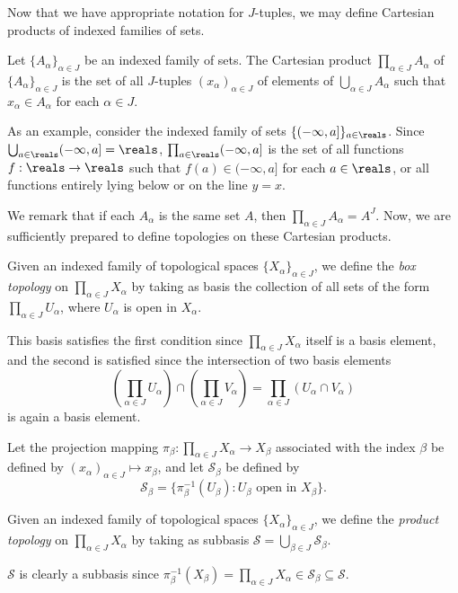 Now that we have appropriate notation for $J$-tuples, we may define Cartesian products of indexed families of sets.
\begin{definition}\label{2.44}
    Let $\{A_\alpha\}_{\alpha \in J}$ be an indexed family of sets. The Cartesian product $\prod_{\alpha \in J}A_\alpha$ of $\{A_\alpha\}_{\alpha \in J}$ is the set of all $J$-tuples $(x_\alpha)_{\alpha \in J}$ of elements of $\bigcup_{\alpha \in J} A_\alpha$ such that $x_\alpha \in A_\alpha$ for each $\alpha \in J$.
\end{definition}
As an example, consider the indexed family of sets $\{(-\infty, a]\}_{a \in \reals}$. Since $\bigcup_{a \in \reals} (-\infty, a] = \reals$, $\prod_{a\in \reals} (-\infty, a]$ is the set of all functions $f: \reals \rightarrow \reals$ such that $f(a) \in (-\infty, a]$ for each $a \in \reals$, or all functions entirely lying below or on the line $y = x$.

We remark that if each $A_\alpha$ is the same set $A$, then $\prod_{\alpha \in J} A_\alpha = A^J$. Now, we are sufficiently prepared to define topologies on these Cartesian products.
\begin{definition}\label{2.45}
    Given an indexed family of topological spaces $\{X_\alpha\}_{\alpha \in J}$, we define the {\it box topology} on $\prod_{\alpha \in J}X_\alpha$ by taking as basis the collection of all sets of the form $\prod_{\alpha \in J}U_\alpha$, where $U_\alpha$ is open in $X_\alpha$.
\end{definition}
This basis satisfies the first condition since $\prod_{\alpha \in J}X_\alpha$ itself is a basis element, and the second is satisfied since the intersection of two basis elements
$$\left( \prod_{\alpha \in J} U_\alpha \right) \cap \left( \prod_{\alpha \in J}V_\alpha\right) = \prod_{\alpha \in J} (U_\alpha \cap V_\alpha)$$
is again a basis element.

\begin{definition}\label{2.46}
    Let the projection mapping $\pi_\beta: \prod_{\alpha \in J}X_\alpha \rightarrow X_\beta$ associated with the index $\beta$ be defined by $(x_\alpha)_{\alpha \in J} \mapsto x_\beta$, and let $\mathcal{S}_\beta$ be defined by
    $$\mathcal{S}_\beta = \{\pi_\beta^{-1}(U_\beta): U_\beta \text{ open in } X_\beta\}.$$

    Given an indexed family of topological spaces $\{X_\alpha\}_{\alpha \in J}$, we define the {\it product topology} on $\prod_{\alpha \in J}X_\alpha$ by taking as subbasis $\mathcal{S} = \bigcup_{\beta \in J} \mathcal{S}_\beta$.
\end{definition}
$\mathcal{S}$ is clearly a subbasis since $\pi_\beta^{-1}(X_\beta) = \prod_{\alpha \in J}X_\alpha \in \mathcal{S}_\beta \subseteq \mathcal{S}$.

